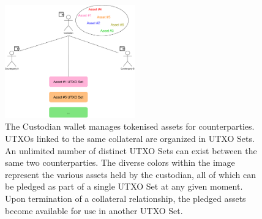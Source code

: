 \begin{figure}[!h]
    \centering
    \includegraphics[width=0.5\textwidth]{images/chapter 3/custodian.drawio.pdf}
    \caption[UTXO Sets]{The Custodian wallet manages tokenised assets for counterparties. UTXOs linked to the same collateral are organized in UTXO Sets. An unlimited number of distinct UTXO Sets can exist between the same two counterparties. The diverse colors within the image represent the various assets held by the custodian, all of which can be pledged as part of a single UTXO Set at any given moment. Upon termination of a collateral relationship, the pledged assets become available for use in another UTXO Set.}
    \label{fig:custodian}
\end{figure}



